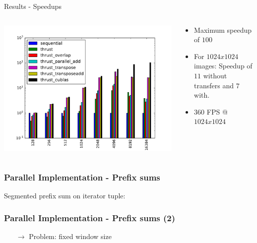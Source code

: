 \documentclass{beamer}
\begin{document}
\begin{frame}{Results - Speedups}
  \begin{columns}
    \begin{column}{7cm}
      \includegraphics[scale=0.4]{imgs/all_speedups.pdf} 
    \end{column}
    \begin{column}{3cm}
      \begin{itemize}
        \item Maximum speedup of $100$
        \item For $1024x1024$ images: Speedup of $11$ without transfers and $7$ with.
\item $360$ FPS @ $1024x1024$
      \end{itemize}
    \end{column}
  \end{columns}
\end{frame} 

\begin{frame}
\frametitle{Parallel Implementation - Prefix sums}
Segmented prefix sum on iterator tuple:


   
\end{frame}

\begin{frame}
\frametitle{Parallel Implementation - Prefix sums (2)}

\begin{enumerate}
\item[$\to$] Problem: fixed window size
\end{enumerate}

\end{frame}
\end{document}

